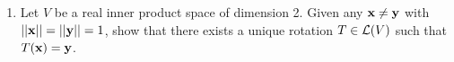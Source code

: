 \begin{exercises}
\begin{enumerate}
	\item Let $V$ be a real inner product space of dimension 2. Given any ${\mathbf{x}}\neq {\mathbf{y}}$ with $\left| \left| {\mathbf{x}}\right|\right|=\left| \left| {\mathbf{y}}\right|\right|=1$, show that there exists a unique rotation $T\in\mathcal{L}(V)$ such that $T({\mathbf{x}})={\mathbf{y}}$.
\end{enumerate}
\end{exercises}

\fi
